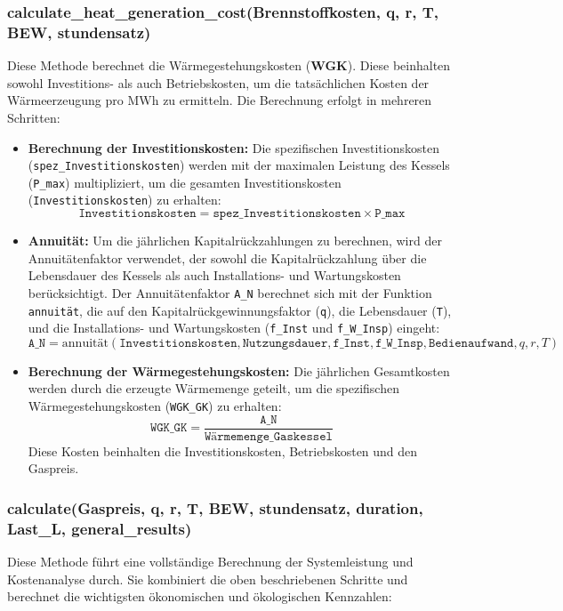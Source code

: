 \subsubsection{calculate\_heat\_generation\_cost(Brennstoffkosten, q, r, T, BEW, stundensatz)}
Diese Methode berechnet die Wärmegestehungskosten (\textbf{WGK}). Diese beinhalten sowohl Investitions- als auch Betriebskosten, um die tatsächlichen Kosten der Wärmeerzeugung pro MWh zu ermitteln. Die Berechnung erfolgt in mehreren Schritten:

\begin{itemize}
    \item \textbf{Berechnung der Investitionskosten:} Die spezifischen Investitionskosten (\texttt{spez\_Investitionskosten}) werden mit der maximalen Leistung des Kessels (\texttt{P\_max}) multipliziert, um die gesamten Investitionskosten (\texttt{Investitionskosten}) zu erhalten:
    \[
    \texttt{Investitionskosten} = \texttt{spez\_Investitionskosten} \times \texttt{P\_max}
    \]
    
    \item \textbf{Annuität:} Um die jährlichen Kapitalrückzahlungen zu berechnen, wird der Annuitätenfaktor verwendet, der sowohl die Kapitalrückzahlung über die Lebensdauer des Kessels als auch Installations- und Wartungskosten berücksichtigt. Der Annuitätenfaktor \texttt{A\_N} berechnet sich mit der Funktion \texttt{annuität}, die auf den Kapitalrückgewinnungsfaktor (\texttt{q}), die Lebensdauer (\texttt{T}), und die Installations- und Wartungskosten (\texttt{f\_Inst} und \texttt{f\_W\_Insp}) eingeht:
    \[
    \texttt{A\_N} = \text{annuität}(\texttt{Investitionskosten}, \texttt{Nutzungsdauer}, \texttt{f\_Inst}, \texttt{f\_W\_Insp}, \texttt{Bedienaufwand}, q, r, T)
    \]

    \item \textbf{Berechnung der Wärmegestehungskosten:} Die jährlichen Gesamtkosten werden durch die erzeugte Wärmemenge geteilt, um die spezifischen Wärmegestehungskosten (\texttt{WGK\_GK}) zu erhalten:
    \[
    \texttt{WGK\_GK} = \frac{\texttt{A\_N}}{\texttt{Wärmemenge\_Gaskessel}}
    \]
    Diese Kosten beinhalten die Investitionskosten, Betriebskosten und den Gaspreis.
\end{itemize}

\subsubsection{calculate(Gaspreis, q, r, T, BEW, stundensatz, duration, Last\_L, general\_results)}
Diese Methode führt eine vollständige Berechnung der Systemleistung und Kostenanalyse durch. Sie kombiniert die oben beschriebenen Schritte und berechnet die wichtigsten ökonomischen und ökologischen Kennzahlen:

